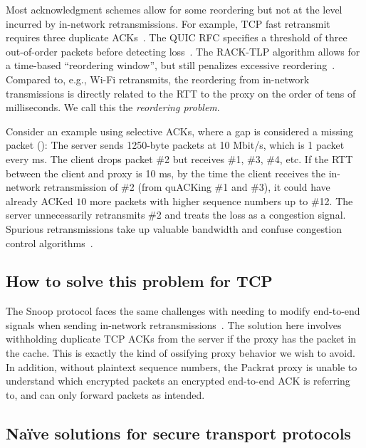 

Most acknowledgment schemes allow for some reordering but not at the level
incurred by in-network retransmissions. For example, TCP fast retransmit requires
three duplicate ACKs~\cite{rfc5681tcp}. The QUIC RFC specifies a threshold of three
out-of-order packets before detecting loss~\cite{rfc9002quic}. The RACK-TLP algorithm
allows for a time-based ``reordering window'', but still penalizes excessive
reordering~\cite{rfc8985}. Compared to, e.g., Wi-Fi retransmits, the
reordering from in-network transmissions is directly related to the RTT to
the proxy on the order of tens of milliseconds.
We call this the \textit{reordering problem}.

Consider an example using selective ACKs, where a gap is considered a missing
packet (): The server sends 1250-byte packets at 10 Mbit/s,
which is 1 packet every ms. The client drops packet \#2 but
receives \#1, \#3, \#4, etc. If the RTT between the client and proxy is 10 ms,
by the time the client receives the in-network retransmission of \#2 (from
quACKing \#1 and \#3), it could
have already ACKed $10$ more packets with higher sequence
numbers up to \#12. The server unnecessarily retransmits \#2 and treats the
loss as a congestion signal.
Spurious retransmissions take up valuable bandwidth and confuse congestion
control algorithms~\cite{leung2007overview}.

\subsection{How to solve this problem for TCP}
\label{sec:packrat:problem:tcp}

The Snoop protocol faces the same challenges with needing to modify end-to-end
signals when sending in-network retransmissions~\cite
{balakrishnan1995snoop}. The solution here involves withholding duplicate TCP
ACKs from the server if the proxy has the packet in the cache. This is exactly
the kind of ossifying proxy behavior we wish to avoid. In addition, without
plaintext sequence numbers, the Packrat proxy is unable to understand which
encrypted packets an encrypted end-to-end ACK is referring to, and can only
forward packets as intended.

\subsection{Na\"ive solutions for secure transport protocols}
\label{sec:packrat:problem:naive}

